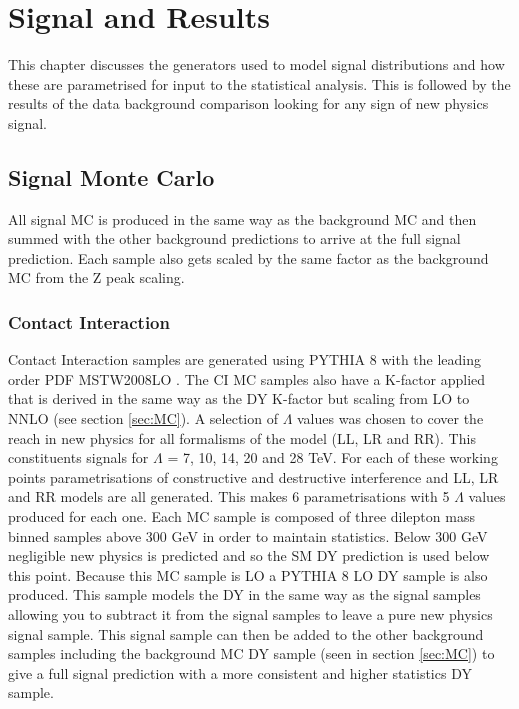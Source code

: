 \chapter{Signal and Results}

This chapter discusses the generators used to model signal distributions and how these are parametrised for input to the statistical analysis. This is followed by the results of the data background comparison looking for any sign of new physics signal.

\section{Signal Monte Carlo}

	All signal MC is produced in the same way as the background MC and then summed with the other background predictions to arrive at the full signal prediction. Each sample also gets scaled by the same factor as the background MC from the Z peak scaling. \\


	\subsection*{Contact Interaction}

	Contact Interaction samples are generated using PYTHIA 8 \cite{} with the leading order PDF MSTW2008LO \cite{}. The CI MC samples also have a K-factor applied that is derived in the same way as the DY K-factor but scaling from LO to NNLO (see section \ref{sec:MC}). A selection of $\Lambda$ values was chosen to cover the reach in new physics for all formalisms of the model (LL, LR and RR). This constituents signals for $\Lambda$ = 7, 10, 14, 20 and 28 TeV. For each of these working points parametrisations of constructive and destructive interference and LL, LR and RR models are all generated. This makes 6 parametrisations with 5 $\Lambda$ values produced for each one. Each MC sample is composed of three dilepton mass binned samples above 300 GeV in order to maintain statistics. Below 300 GeV negligible new physics is predicted and so the SM DY prediction is used below this point. 
	Because this MC sample is LO a PYTHIA 8 LO DY sample is also produced. This sample models the DY in the same way as the signal samples allowing you to subtract it from the signal samples to leave a pure new physics signal sample. This signal sample can then be added to the other background samples including the background MC DY sample (seen in section \ref{sec:MC}) to give a full signal prediction with a more consistent and higher statistics DY sample.


